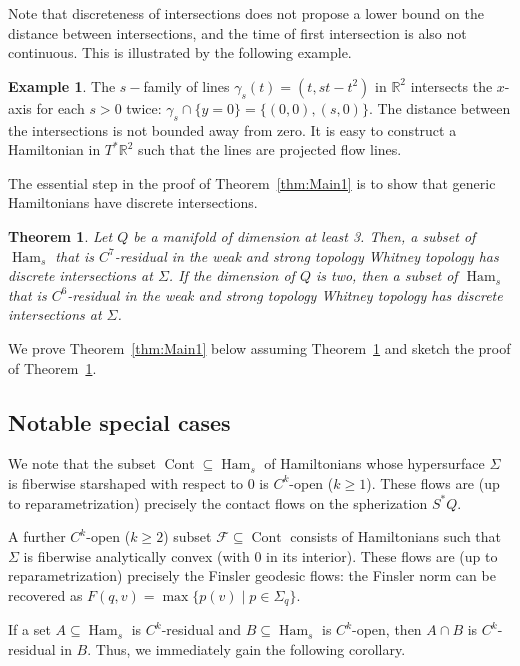 \documentclass{amsart}
\newcommand{\Fcal}{{\mathcal{F}}}
\newcommand{\RR}{\mathbb{R}}
\newcommand{\Cont}{\operatorname{Cont}}
\newcommand{\Ham}{\operatorname{Ham}}
\newtheorem{theorem}{Theorem}
\theoremstyle{definition}
\newtheorem{example}[proposition]{Example}
\theoremstyle{remark}
\numberwithin{equation}{section}
\begin{document}
Note that discreteness of intersections does not propose a lower bound on the distance between intersections, and the time of first intersection is also not continuous. This is illustrated by the following example.
\begin{example}
    The $s-$family of lines $\gamma_s(t)=(t, st-t^2)$ in $\RR^2$ intersects the $x$-axis for each $s>0$ twice: $\gamma_s\cap\{y=0\}=\{(0,0),(s,0)\}$. The distance between the intersections is not bounded away from zero. It is easy to construct a Hamiltonian in $T^*\RR^2$ such that the lines are projected flow lines.
\end{example}

The essential step in the proof of Theorem~\ref{thm:Main1} is to show that generic Hamiltonians have discrete intersections.

\begin{theorem}\label{thm:discreteIntersections}
    Let $Q$ be a manifold of dimension at least 3. Then, a  subset of $\Ham_s$ that is $C^7$-residual in the weak and strong topology Whitney topology has discrete intersections at $\Sigma$. 
    If the dimension of $Q$ is two, then a  subset of $\Ham_s$ that is $C^6$-residual in the weak and strong topology Whitney topology has discrete intersections at $\Sigma$. 
\end{theorem}

We prove Theorem~\ref{thm:Main1} below assuming Theorem~\ref{thm:discreteIntersections} and sketch the proof of Theorem~\ref{thm:discreteIntersections}.

\subsection{Notable special cases}
We note that the subset $\Cont\subseteq \Ham_s$ of Hamiltonians whose hypersurface $\Sigma$ is fiberwise starshaped with respect to 0 is $C^k$-open ($k\geq 1$). These flows are (up to reparametrization) precisely the contact flows on the spherization $S^*Q$.

A further $C^k$-open ($k\geq 2$) subset $\Fcal\subseteq\Cont$ consists of Hamiltonians such that $\Sigma$ is fiberwise analytically convex (with 0 in its interior). These flows are (up to reparametrization) precisely the Finsler geodesic flows: the Finsler norm can be recovered as $F(q,v)=\max\{p(v)\mid p\in \Sigma_q\}$.

If a set $A\subseteq \Ham_s$ is $C^k$-residual and $B\subseteq \Ham_s$ is $C^k$-open, then $A\cap B$ is $C^k$-residual in $B$. Thus, we immediately gain the following corollary.
\end{document}
